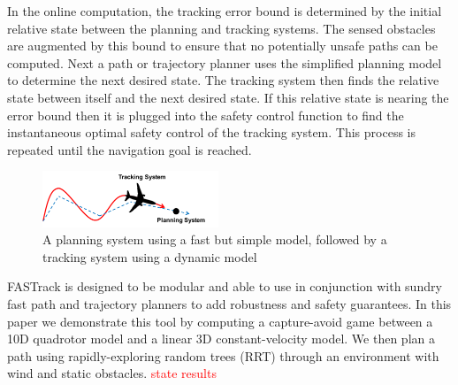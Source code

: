 In the online computation, the tracking error bound is determined by the initial relative state between the planning and tracking systems. The sensed obstacles are augmented by this bound to ensure that no potentially unsafe paths can be computed. Next a path or trajectory planner uses the simplified planning model to determine the next desired state. The tracking system then finds the relative state between itself and the next desired state. If this relative state is nearing the error bound then it is plugged into the safety control function to find the instantaneous optimal safety control of the tracking system. This process is repeated until the navigation goal is reached. 
  

\begin{figure}
	\centering
	\includegraphics[width=0.47\textwidth]{fig/chasing}
	\caption{A planning system using a fast but simple model, followed by a tracking system using a dynamic model}
	\label{fig:chasing}
	\vspace{-.2in}
\end{figure}
%
FASTrack is designed to be modular and able to use in conjunction with sundry fast path and trajectory planners to add robustness and safety guarantees. In this paper we demonstrate this tool by computing a capture-avoid game between a 10D quadrotor model and a linear 3D constant-velocity model. We then plan a path using rapidly-exploring random trees (RRT) through an environment with wind and static obstacles. \textcolor{red}{state results}